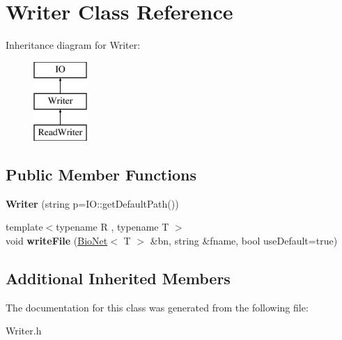 \hypertarget{class_writer}{}\section{Writer Class Reference}
\label{class_writer}
Inheritance diagram for Writer\+:\begin{figure}[H]
\begin{center}
\leavevmode
\includegraphics[height=3.000000cm]{class_writer}
\end{center}
\end{figure}
\subsection*{Public Member Functions}
\begin{DoxyCompactItemize}
\item 
\mbox{\label{class_writer_a1754ec3741573fef15043d5e4b29f14f}} 
{\bfseries Writer} (string p=I\+O\+::get\+Default\+Path())
\item 
\mbox{\label{class_writer_a285f9a71846bc81fe7de2575c72db480}} 
{\footnotesize template$<$typename R , typename T $>$ }\\void {\bfseries write\+File} (\hyperlink{class_bio_net}{Bio\+Net}$<$ T $>$ \&bn, string \&fname, bool use\+Default=true)
\end{DoxyCompactItemize}
\subsection*{Additional Inherited Members}


The documentation for this class was generated from the following file\+:\begin{DoxyCompactItemize}
\item 
Writer.\+h\end{DoxyCompactItemize}
